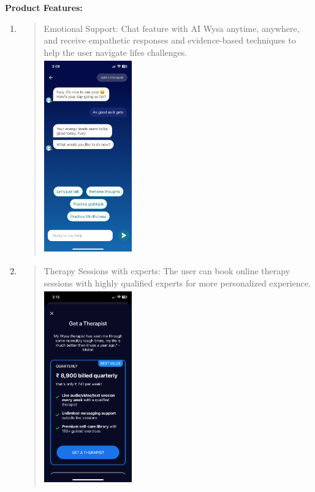 \documentclass[manuscript,screen,review]{acmart}
\begin{document}
\textbf{Product Features:}
\begin{enumerate}
\def\labelenumi{\arabic{enumi}.}
\item
  \begin{quote}
  Emotional Support: Chat feature with AI Wysa anytime, anywhere, and
  receive empathetic responses and evidence-based techniques to help the
  user navigate life\textquotesingle s challenges.\\
  \includegraphics[width=1.49474in,height=3.31321in]{vertopal.com_Untitleddocument/vertopal_25c0ff455f73469eb1b6e3e4452807f6/media/image2.png}
  \end{quote}
\item
  \begin{quote}
  Therapy Sessions with experts: The user can book online therapy
  sessions with highly qualified experts for more personalized
  experience.\\
  \includegraphics[width=1.49474in,height=3.31321in]{vertopal.com_Untitleddocument/vertopal_25c0ff455f73469eb1b6e3e4452807f6/media/image1.png}

\end{quote}
\end{enumerate}
\end{document}
